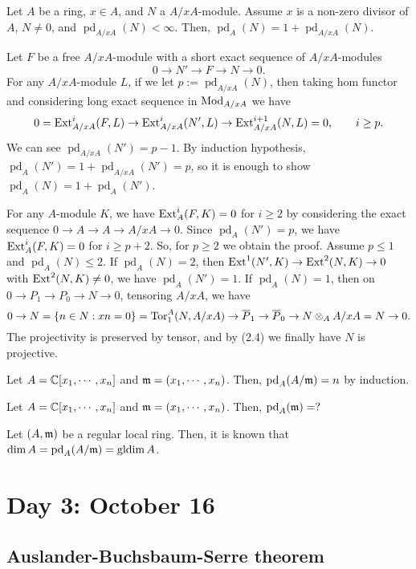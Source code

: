 \documentclass{../../../small}
\renewcommand{\pd}{\operatorname{pd}}
\newcommand{\gldim}{\operatorname{gldim}}
\begin{document}
\begin{thm*}
Let $A$ be a ring, $x\in A$, and $N$ a $A/xA$-module.
Assume $x$ is a non-zero divisor of $A$, $N\ne0$, and $\pd_{A/xA}(N)<\infty$.
Then, $\pd_A(N)=1+\pd_{A/xA}(N)$.
\end{thm*}
\begin{pf}
Let $F$ be a free $A/xA$-module with a short exact sequence of $A/xA$-modules
\[0\to N'\to F\to N\to0.\]
For any $A/xA$-module $L$, if we let $p:=\pd_{A/xA}(N)$, then taking hom functor and considering long exact sequence in $\operatorname{Mod}_{A/xA}$ we have
\[0=\operatorname{Ext}_{A/xA}^i(F,L)\to\operatorname{Ext}_{A/xA}^i(N',L)\to\operatorname{Ext}_{A/xA}^{i+1}(N,L)=0,\qquad i\ge p.\]
We can see $\pd_{A/xA}(N')=p-1$.
By induction hypothesis, $\pd_A(N')=1+\pd_{A/xA}(N')=p$, so it is enough to show $\pd_A(N)=1+\pd_A(N')$.

For any $A$-module $K$, we have $\operatorname{Ext}_A^i(F,K)=0$ for $i\ge2$ by considering the exact sequence $0\to A\to A\to A/xA\to0$.
Since $\pd_A(N')=p$, we have $\operatorname{Ext}_A^i(F,K)=0$ for $i\ge p+2$.
So, for $p\ge2$ we obtain the proof.
Assume $p\le1$ and $\pd_A(N)\le2$.
If $\pd_A(N)=2$, then $\operatorname{Ext}^1(N',K)\to\operatorname{Ext}^2(N,K)\to0$ with $\operatorname{Ext}^2(N,K)\ne0$, we have $\pd_A(N')=1$.
If $\pd_A(N)=1$, then on $0\to P_1\to P_0\to N\to0$, tensoring $A/xA$, we have
\[0\to N=\{n\in N:xn=0\}=\operatorname{Tor}_1^A(N,A/xA)\to\overline P_1\to\overline P_0\to N\otimes_AA/xA=N\to0.\]
The projectivity is preserved by tensor, and by (2.4) we finally have $N$ is projective.
\end{pf}

\begin{ex*}[2.14]
Let $A=\mathbb{C}[x_1,\cdots,x_n]$ and $\mathfrak{m}=(x_1,\cdots,x_n)$.
Then, $\pd_A(A/\fm)=n$ by induction.
\end{ex*}

\begin{exe*}[2.15]
Let $A=\mathbb{C}[x_1,\cdots,x_n]$ and $\mathfrak{m}=(x_1,\cdots,x_n)$.
Then, $\pd_A(\fm)=?$
\end{exe*}

\begin{rmk*}[2.16]
Let $(A,\mathfrak{m})$ be a regular local ring.
Then, it is known that $\dim A=\pd_A(A/\fm)=\gldim A$.
\end{rmk*}



\newpage
\section{Day 3: October 16}
\subsection*{Auslander-Buchsbaum-Serre theorem}
\end{document}
